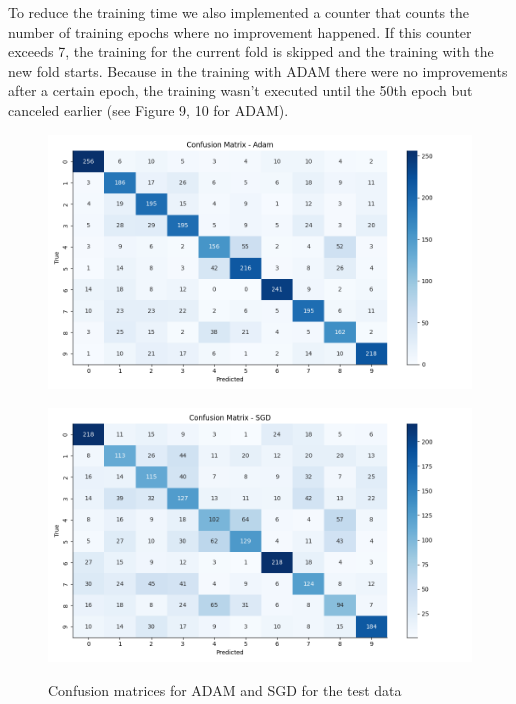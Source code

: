 \documentclass{tubaf-article}
\begin{document}
	To reduce the training time we also implemented a counter that counts the number of training epochs where no improvement happened. If this counter exceeds 7, the training for the current fold is skipped and the training with the new fold starts. Because in the training with ADAM there were no improvements after a certain epoch, the training wasn't executed until the 50th epoch but canceled earlier (see Figure 9, 10 for ADAM).
	\begin{figure}[h!]
		\centering
		\begin{minipage}{0.45\textwidth}
			\centering
			\includegraphics[width=\linewidth]{confusion_matrix_Adam.png}
			\label{fig:bild1}
		\end{minipage} \hfill
		\begin{minipage}{0.45\textwidth}
			\centering
			\includegraphics[width=\linewidth]{confusion_matrix_SGD.png}
			\label{fig:bild2}
		\end{minipage}
		\caption{Confusion matrices for ADAM and SGD for the test data}
		\label{fig:zwei_bilder}
	\end{figure}
\end{document}
